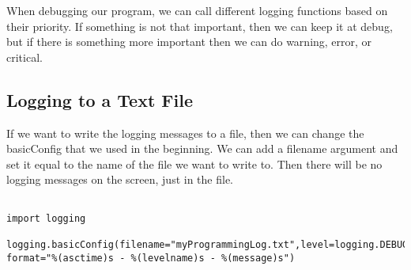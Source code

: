 \documentclass[11pt]{article}
\begin{document}
When debugging our program, we can call different logging functions based on their priority. If something is not that important, then we can keep it at debug, but if there is something more important then we can do warning, error, or critical.

\subsection{Logging to a Text File}
\label{sec:org9613b06}

If we want to write the logging messages to a file, then we can change the basicConfig that we used in the beginning. We can add a filename argument and set it equal to the name of the file we want to write to. Then there will be no logging messages on the screen, just in the file.

\begin{verbatim}

import logging

logging.basicConfig(filename="myProgrammingLog.txt",level=logging.DEBUG, format="%(asctime)s - %(levelname)s - %(message)s")

\end{verbatim}
\end{document}
